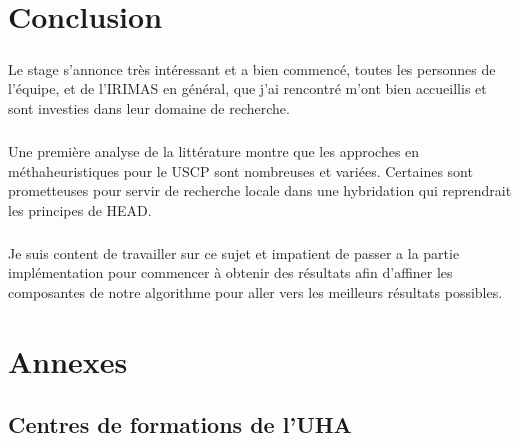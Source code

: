 \documentclass[a4paper,11pt,twoside,french,report]{../common/simplem}
\begin{document}
	\chapter*{Conclusion}
		\paragraph*{}
			Le stage s'annonce très intéressant et a bien commencé, toutes les personnes de l'équipe, et de l'\gls{IRIMAS} en général, que j'ai rencontré m'ont bien accueillis et sont investies dans leur domaine de recherche.
		\paragraph*{}
			Une première analyse de la littérature montre que les approches en méthaheuristiques pour le \gls{USCP} sont nombreuses et variées. Certaines sont prometteuses pour servir de recherche locale dans une hybridation qui reprendrait les principes de \gls{HEAD}.
		\paragraph*{}
			Je suis content de travailler sur ce sujet et impatient de passer a la partie implémentation pour commencer à obtenir des résultats afin d'affiner les composantes de notre algorithme pour aller vers les meilleurs résultats possibles.
	\printbibliography[heading=bibintoc]{}
	\printglossary[type=\acronymtype,nogroupskip=true,title=Lexique,toctitle=Lexique]{}
	\chapter*{Annexes}
		\setcounter{section}{0}
		\renewcommand{\thesection}{\Alph{section}}
		\renewcommand{\theHsection}{appendixsection.\Alph{section}}
		\section{Centres de formations de l'\acrshort{UHA}}\label{sec:uha_formation}
			\paragraph*{}
				
				\hfill\\
			\paragraph*{}
				
				\hfill\\
\end{document}
